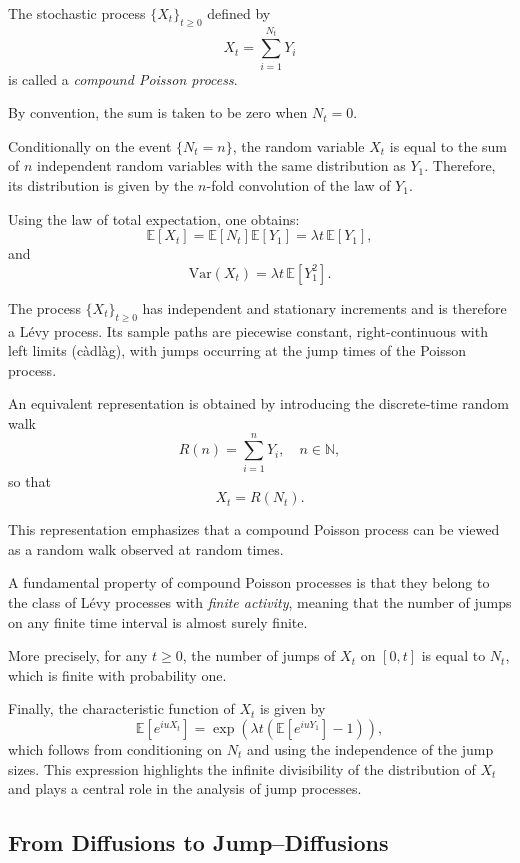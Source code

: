 \begin{definition}
The stochastic process $\{X_t\}_{t \geq 0}$ defined by
\[
X_t = \sum_{i=1}^{N_t} Y_i
\]
is called a \emph{compound Poisson process}.
\end{definition}

By convention, the sum is taken to be zero when $N_t = 0$.

Conditionally on the event $\{N_t = n\}$, the random variable $X_t$ is equal to the sum of $n$ independent random variables with the same distribution as $Y_1$. Therefore, its distribution is given by the $n$-fold convolution of the law of $Y_1$.

Using the law of total expectation, one obtains:
\[
\mathbb{E}[X_t] = \mathbb{E}[N_t] \mathbb{E}[Y_1] = \lambda t \, \mathbb{E}[Y_1],
\]
and
\[
\mathrm{Var}(X_t) = \lambda t \, \mathbb{E}[Y_1^2].
\]

The process $\{X_t\}_{t \geq 0}$ has independent and stationary increments and is therefore a L\'evy process. Its sample paths are piecewise constant, right-continuous with left limits (c\`adl\`ag), with jumps occurring at the jump times of the Poisson process.

\medskip

An equivalent representation is obtained by introducing the discrete-time random walk
\[
R(n) = \sum_{i=1}^{n} Y_i, \quad n \in \mathbb{N},
\]
so that
\[
X_t = R(N_t).
\]

This representation emphasizes that a compound Poisson process can be viewed as a random walk observed at random times.

\medskip

A fundamental property of compound Poisson processes is that they belong to the class of L\'evy processes with \emph{finite activity}, meaning that the number of jumps on any finite time interval is almost surely finite.

More precisely, for any $t \geq 0$, the number of jumps of $X_t$ on $[0,t]$ is equal to $N_t$, which is finite with probability one.

\medskip

Finally, the characteristic function of $X_t$ is given by
\[
\mathbb{E}\left[e^{iu X_t}\right] = \exp\left( \lambda t \left( \mathbb{E}[e^{iuY_1}] - 1 \right) \right),
\]
which follows from conditioning on $N_t$ and using the independence of the jump sizes.
This expression highlights the infinite divisibility of the distribution of $X_t$ and plays a central role in the analysis of jump processes.
\subsection{From Diffusions to Jump--Diffusions}\label{sec:jump-diffusion}


